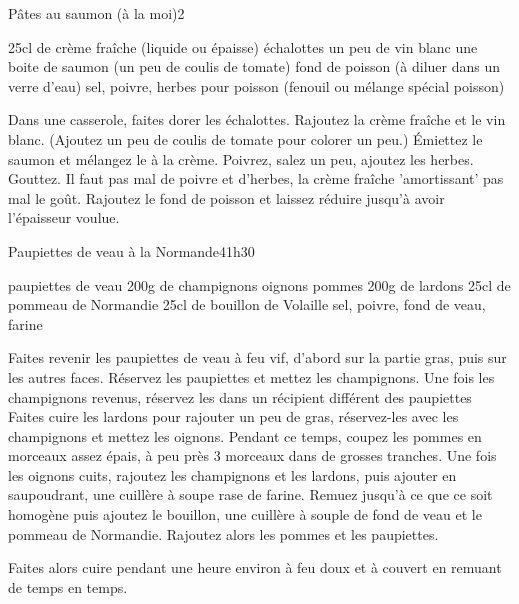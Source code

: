 \begin{recette}{Pâtes au saumon (à la moi)}{2}{}{}
\begin{ingredients}
\ingredient 25cl de crème fraîche (liquide ou épaisse)
 échalottes
\ingredient un peu de vin blanc
\ingredient une boite de saumon
\ingredient (un peu de coulis de tomate)
\ingredient fond de poisson (à diluer dans un verre d'eau)
\ingredient sel, poivre, herbes pour poisson (fenouil ou mélange spécial poisson)
\end{ingredients}

\begin{preparation}
\etape Dans une casserole, faites dorer les échalottes. 
\etape Rajoutez la crème fraîche et le vin blanc. (Ajoutez un peu de coulis de tomate pour colorer un peu.)
\etape Émiettez le saumon et mélangez le à la crème. Poivrez, salez un peu, ajoutez les herbes. Gouttez. Il faut pas mal de poivre et d'herbes, la crème fraîche 'amortissant' pas mal le goût.
\etape Rajoutez le fond de poisson et laissez réduire jusqu'à avoir l'épaisseur voulue.
\end{preparation}

\end{recette}

\begin{recette}{Paupiettes de veau à la Normande}{4}{1h30}{}
\begin{ingredients}
 paupiettes de veau
\ingredient 200g de champignons
 oignons
 pommes
\ingredient 200g de lardons
\ingredient 25cl de pommeau de Normandie
\ingredient 25cl de bouillon de Volaille
\ingredient sel, poivre, fond de veau, farine
\end{ingredients}

\begin{preparation}
\etape Faites revenir les paupiettes de veau à feu vif, d'abord sur la partie gras, puis sur les autres faces. 
\etape Réservez les paupiettes et mettez les champignons.
\etape Une fois les champignons revenus, réservez les dans un récipient différent des paupiettes
\etape Faites cuire les lardons pour rajouter un peu de gras, réservez-les avec les champignons et mettez les oignons. 
\etape Pendant ce temps, coupez les pommes en morceaux assez épais, à peu près 3 morceaux dans de grosses tranches. 
\etape Une fois les oignons cuits, rajoutez les champignons et les lardons, puis ajouter en saupoudrant, une cuillère à soupe rase de farine. Remuez jusqu'à ce que ce soit homogène puis ajoutez le bouillon, une cuillère à souple de fond de veau et le pommeau de Normandie. 
\etape Rajoutez alors les pommes et les paupiettes.
\end{preparation}

\begin{cuisson}
Faites alors cuire pendant une heure environ à feu doux et à couvert en remuant de temps en temps.
\end{cuisson}


\end{recette}

